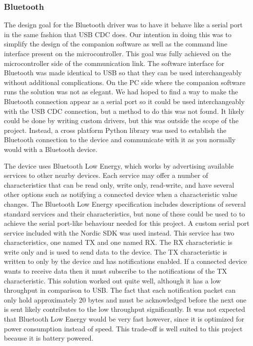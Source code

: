 \subsubsection{Bluetooth}

The design goal for the Bluetooth driver was to have it behave like a serial
port in the same fashion that USB CDC does. Our intention in doing this was to 
simplify the design of the companion software as well as the command line 
interface present on the microcontroller. This goal was fully achieved 
on the microcontroller side of the communication link. The software interface for 
Bluetooth was made identical to USB so that they can be used interchangeably 
without additional complications. On the PC side where the companion software
runs the solution was not as elegant. We had hoped to find a way to make the
Bluetooth connection appear as a serial port so it could be used interchangeably
with the USB CDC connection, but a method to do this was not found. It likely
could be done by writing custom drivers, but this was outside the scope of the
project. Instead, a cross platform Python library was used to establish the
Bluetooth connection to the device and communicate with it as you normally
would with a Bluetooth device.

The device uses Bluetooth Low Energy, which works by advertising
available services to other nearby devices. Each service may offer a number
of characteristics that can be read only, write only, read-write, and have 
several other options such as notifying a connected device when a characteristic
value changes. The Bluetooth Low Energy specification includes descriptions of several
standard services and their characteristics, but none of these could be used to
to achieve the serial port-like behaviour needed for this project. A custom
serial port service included with the Nordic SDK was used instead. This service
has two characteristics, one named TX and one named RX. The RX characteristic is
write only and is used to send data to the device. The TX characteristic is
written to only by the device and has notifications enabled. If a connected device
wants to receive data then it must subscribe to the notifications of the TX 
characteristic. This solution worked out quite well, although it has a low 
throughput in comparison to USB. The fact that each notification packet can only 
hold approximately 20 bytes and must be acknowledged before the next one is 
sent likely contributes to the low throughput significantly. It was not expected
that Bluetooth Low Energy would be very fast however, since it is optimized for 
power consumption instead of speed. This trade-off is well suited to this project 
because it is battery powered.

